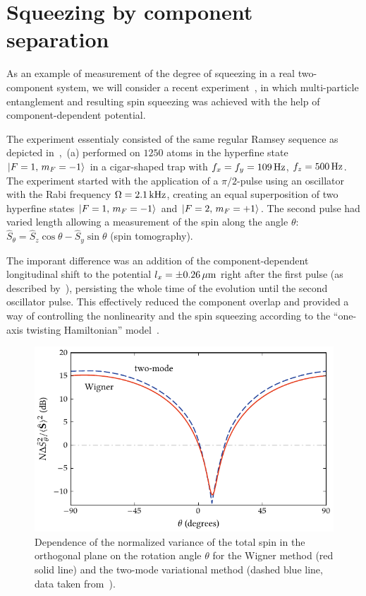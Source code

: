\section{Squeezing by component separation}

As an example of measurement of the degree of squeezing in a real two-component  system, we will consider a recent experiment~\cite{Riedel2010}, in which multi-particle entanglement and resulting spin squeezing was achieved with the help of component-dependent potential.

The experiment essentialy consisted of the same regular Ramsey sequence as depicted in~,~(a) performed on $1250$ \Rb{} atoms in the hyperfine state ${\mbox{\ensuremath{\left\vert F=1,\, m_F=-1 \right\rangle}}}$ in a cigar-shaped trap with $f_x = f_y = 109\mbox{\ensuremath{\,\mathrm{Hz}}}$, $f_z = 500\mbox{\ensuremath{\,\mathrm{Hz}}}$.
The experiment started with the application of a $\pi/2$-pulse using an oscillator with the Rabi frequency $\Omega=2.1\mbox{\ensuremath{\,\mathrm{kHz}}}$, creating an equal superposition of two hyperfine states ${\mbox{\ensuremath{\left\vert F=1,\, m_F=-1 \right\rangle}}}$ and ${\mbox{\ensuremath{\left\vert F=2,\, m_F=+1 \right\rangle}}}$.
The second pulse had varied length allowing a measurement of the spin along the angle $\theta$: $\hat{S}_\theta = \hat{S}_z \cos \theta - \hat{S}_y \sin \theta$ (spin tomography).

The imporant difference was an addition of the component-dependent longitudinal shift to the potential $l_x = \pm 0.26\mbox{\ensuremath{\,\mathrm{\mu m}}}$ right after the first pulse (as described by~), persisting the whole time of the evolution until the second oscillator pulse.
This effectively reduced the component overlap and provided a way of controlling the nonlinearity and the spin squeezing according to the ``one-axis twisting Hamiltonian'' model~\cite{Kitagawa1993}.

\begin{figure}
    \centerline{\includegraphics{figures_generated/bec_squeezing/riedel_rotation.pdf}}

    \caption{
    Dependence of the normalized variance of the total spin in the orthogonal plane on the rotation angle $\theta$ for the Wigner method (red solid line) and the two-mode variational method (dashed blue line, data taken from~\cite{Riedel2010}).
    }
    \label{fig:bec-squeezing:separation:tomography}
\end{figure}

